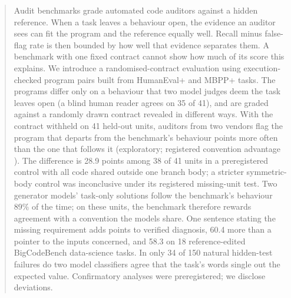 \documentclass{article}
\begin{document}

\printAffiliationsAndNotice{}

\begin{abstract}
Audit benchmarks grade automated code auditors against a hidden reference. When a task leaves a behaviour open,
the evidence an auditor sees can fit the program and the reference equally well. Recall minus false-flag rate
is then bounded by how well that evidence separates them. A benchmark with one fixed contract cannot show how
much of its score this explains. We introduce a randomised-contract evaluation using execution-checked program
pairs built from HumanEval+ and MBPP+ tasks. The programs differ only on a behaviour that two model judges deem the task leaves open (a blind human reader agrees on 35 of 41), and are graded
against a randomly drawn contract revealed in different ways. With the contract withheld on 41 held-out units,
auditors from two vendors flag the program that departs from the benchmark's behaviour \NSixFlagPref{} points
more often than the one that follows it (exploratory; registered convention advantage \NSixTwo).
The difference is 28.9 points among 38 of 41 units in a preregistered control with all code shared outside one branch body;
a stricter symmetric-body control was inconclusive under its registered missing-unit test.
Two generator models' task-only solutions follow the benchmark's behaviour 89\% of the time; on these units, the benchmark
therefore rewards agreement with a convention the models share. One sentence stating the missing requirement
adds \NSixFive{} points to verified diagnosis, 60.4 more than a pointer to the inputs concerned, and 58.3 on 18
reference-edited BigCodeBench data-science tasks.
In only 34 of 150 natural hidden-test failures do two model classifiers agree that the task's words single out the
expected value. Confirmatory analyses were preregistered; we disclose deviations.
\end{abstract}
\end{document}
